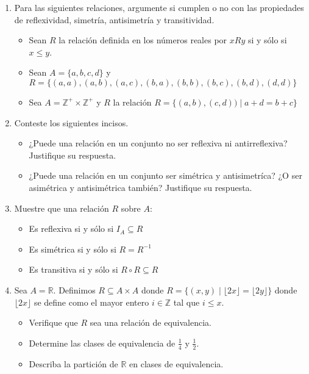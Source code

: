 \documentclass[letterpaper,11pt]{article}
\begin{document}
\begin{enumerate}
    \item Para las siguientes relaciones, argumente si cumplen o no con las 
    propiedades de reflexividad, simetría, antisimetría y transitividad.

    \begin{itemize}
        \item Sean $R$ la relación definida en los números reales por $xRy$
        si y sólo si $x \leq y$.
        \item Sean $A = \{a,b,c,d\}$ y $R = \{(a,a), (a,b), (a,c), (b,a), (b,b),
        (b,c), (b,d), (d,d)\}$
        \item Sea $A = ℤ^{+} × ℤ^{+}$ y $R$ la relación $R = \{(a,b), (c,d)) \; 
        | \; a + d = b + c\}$
    \end{itemize}

    \item Conteste los siguientes incisos.
    \begin{itemize}
        \item ¿Puede una relación en un conjunto no ser reflexiva ni
        antirreflexiva? Justifique su respuesta.
        \item ¿Puede una relación en un conjunto ser simétrica y 
        antisimetríca? ¿O ser asimétrica y antisimétrica también? Justifique su
        respuesta.  
    \end{itemize}

    \item Muestre que una relación $R$ sobre $A$:
    \begin{itemize}
        \item Es reflexiva si y sólo si $I_{A} ⊆ R$
        \item Es simétrica si y sólo si $R = R^{-1}$
        \item Es transitiva si y sólo si $R ∘ R ⊆ R$
    \end{itemize}

    \item Sea $A = ℝ$. Definimos $R ⊆ A × A$ donde $R = \{(x, y) \; | \; 
    ⌊2x⌋ = ⌊2y⌋\}$ donde $⌊2x⌋$ se define como el mayor entero $i \in ℤ$ tal que 
    $i \leq x$.
    \begin{itemize}
        \item Verifique que $R$ sea una relación de equivalencia.
        \item Determine las clases de equivalencia de $\frac{1}{4}$ y 
        $\frac{1}{2}$.
        \item Describa la partición de $ℝ$ en clases de equivalencia.
    \end{itemize}


\end{enumerate}
\end{document}
